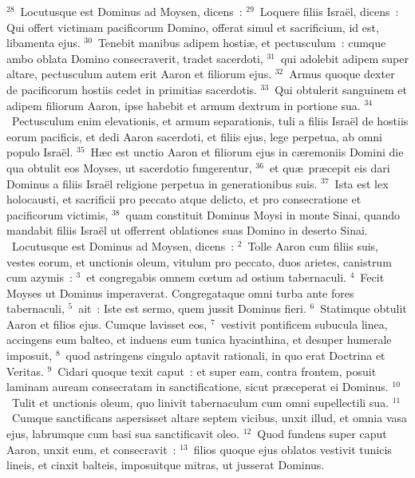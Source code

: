 ${}^{28}$~Locutusque est Dominus ad Moysen, dicens~:
${}^{29}$~Loquere filiis Isra\"el, dicens~: Qui offert victimam pacificorum Domino, offerat simul et sacrificium, id est, libamenta ejus.
${}^{30}$~Tenebit manibus adipem hosti\ae , et pectusculum~: cumque ambo oblata Domino consecraverit, tradet sacerdoti,
${}^{31}$~qui adolebit adipem super altare, pectusculum autem erit Aaron et filiorum ejus.
${}^{32}$~Armus quoque dexter de pacificorum hostiis cedet in primitias sacerdotis.
${}^{33}$~Qui obtulerit sanguinem et adipem filiorum Aaron, ipse habebit et armum dextrum in portione sua.
${}^{34}$~Pectusculum enim elevationis, et armum separationis, tuli a filiis Isra\"el de hostiis eorum pacificis, et dedi Aaron sacerdoti, et filiis ejus, lege perpetua, ab omni populo Isra\"el.
${}^{35}$~H\ae c est unctio Aaron et filiorum ejus in c\ae remoniis Domini die qua obtulit eos Moyses, ut sacerdotio fungerentur,
${}^{36}$~et qu\ae\ pr\ae cepit eis dari Dominus a filiis Isra\"el religione perpetua in generationibus suis.
${}^{37}$~Ista est lex holocausti, et sacrificii pro peccato atque delicto, et pro consecratione et pacificorum victimis,
${}^{38}$~quam constituit Dominus Moysi in monte Sinai, quando mandabit filiis Isra\"el ut offerrent oblationes suas Domino in deserto Sinai.
~\lettrine[lines=10,image=true,loversize=0.05,lraise=-0.03]{L}{}ocutusque est Dominus ad Moysen, dicens~:
${}^{2}$~Tolle Aaron cum filiis suis, vestes eorum, et unctionis oleum, vitulum pro peccato, duos arietes, canistrum cum azymis~:
${}^{3}$~et congregabis omnem cœtum ad ostium tabernaculi.
${}^{4}$~Fecit Moyses ut Dominus imperaverat. Congregataque omni turba ante fores tabernaculi,
${}^{5}$~ait~: Iste est sermo, quem jussit Dominus fieri.
${}^{6}$~Statimque obtulit Aaron et filios ejus. Cumque lavisset eos,
${}^{7}$~vestivit pontificem subucula linea, accingens eum balteo, et induens eum tunica hyacinthina, et desuper humerale imposuit,
${}^{8}$~quod astringens cingulo aptavit rationali, in quo erat Doctrina et Veritas.
${}^{9}$~Cidari quoque texit caput~: et super eam, contra frontem, posuit laminam auream consecratam in sanctificatione, sicut pr\ae ceperat ei Dominus.
${}^{10}$~Tulit et unctionis oleum, quo linivit tabernaculum cum omni supellectili sua.
${}^{11}$~Cumque sanctificans aspersisset altare septem vicibus, unxit illud, et omnia vasa ejus, labrumque cum basi sua sanctificavit oleo.
${}^{12}$~Quod fundens super caput Aaron, unxit eum, et consecravit~:
${}^{13}$~filios quoque ejus oblatos vestivit tunicis lineis, et cinxit balteis, imposuitque mitras, ut jusserat Dominus.


